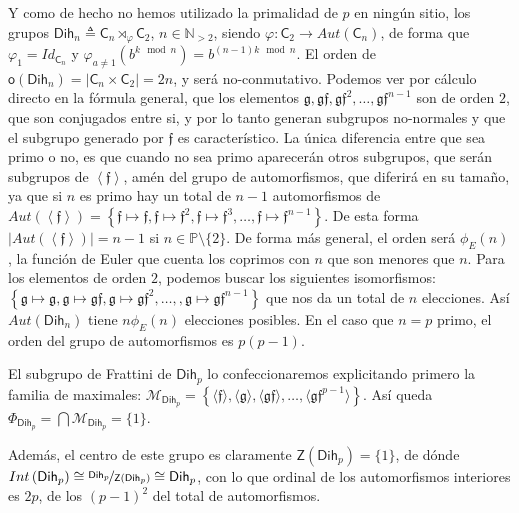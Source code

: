 \documentclass[12pt,a4paper,fleqn,spanish,final,openright]{extbook}
\theoremstyle{definition}
\theoremstyle{remark}
\begin{document}
Y como de hecho no hemos utilizado la primalidad de $p$ en ningún sitio, los grupos $\mathsf{Dih}_{n} \triangleq \mathsf{C}_{n}\rtimes_{\varphi }\mathsf{C}_{2}$, $n    \in \mathds{N}_{{}>2}$, siendo $\varphi : \mathsf{C}_{2}     \longrightarrow     Aut(\mathsf{C}_{n})$, de forma que $\varphi_1 = Id_{\mathsf{C}_{n}}$ y $\varphi_{a    \neq     1}(b^{k \mod n}) = b^{(n-1)k \mod n}$. El orden de $\mathsf{o}(\mathsf{Dih}_{n})=\left|\mathsf{C}_{n}    \times     \mathsf{C}_{2}\right|=2n$, y será no-conmutativo.
Podemos ver por cálculo directo en la fórmula general, que los elementos $\mathfrak{g},\mathfrak{gf},\mathfrak{gf}^2, \ldots , \mathfrak{gf}^{n-1}$ son de orden $2$, que son conjugados entre si, y por lo tanto generan subgrupos no-normales y que el subgrupo generado por $\mathfrak{f}$ es característico. La única diferencia entre que sea primo o no, es que cuando no sea primo aparecerán otros subgrupos, que serán subgrupos de $\left\langle\mathfrak{f}\right\rangle$, amén del grupo de automorfismos, que diferirá en su tamaño, ya que si $n$ es primo hay un total de $n-1$ automorfismos de $Aut(\left\langle\mathfrak{f}\right\rangle) = \left\lbrace{\mathfrak{f}   \mapsto \mathfrak{f},\mathfrak{f}   \mapsto \mathfrak{f}^2,\mathfrak{f}   \mapsto \mathfrak{f}^3,\ldots ,\mathfrak{f}   \mapsto \mathfrak{f}^{n-1} }\right\rbrace$. De esta forma $\left|Aut(\left\langle\mathfrak{f}\right\rangle)\right|=n-1$ si $n   \in \mathds{P}\setminus\{2\}$. De forma más general, el orden será $\phi_{E}(n)$, la función de Euler que cuenta los coprimos con $n$ que son menores que $n$.
Para los elementos de orden $2$, podemos buscar los siguientes isomorfismos: $\left\{{\mathfrak{g}   \mapsto \mathfrak{g},\mathfrak{g}   \mapsto \mathfrak{g}\mathfrak{f},\mathfrak{g}   \mapsto \mathfrak{g}\mathfrak{f}^2,\ldots,,\mathfrak{g}   \mapsto \mathfrak{g}\mathfrak{f}^{n-1}}\right\}$ que nos da un total de $n$ elecciones. Así $Aut(\mathsf{Dih}_{n})$ tiene $n\phi_{E}(n)$ elecciones posibles. En el caso que $n=p$ primo, el orden del grupo de automorfismos es $p(p-1)$.

El subgrupo de Frattini de ${\mathsf{Dih}}_{p}$ lo confeccionaremos explicitando primero la familia de maximales:
${\mathcal{M}}_{{\mathsf{Dih}}_{p}} = \left\{ { \langle \mathfrak{f} \rangle,\langle \mathfrak{g} \rangle,\langle
\mathfrak{gf}\rangle,\ldots,\langle \mathfrak{gf}^{p-1}\rangle } \right\} $. Así queda $\Phi_{{\mathsf{Dih}}_{p}} =
\bigcap\mathcal{M}_{{\mathsf{Dih}}_{p}} = \{1\}$.

Además, el centro de este grupo es claramente $\mathsf{Z}\left({{\mathsf{Dih}}_{p}}\right)=\{1\}$, de dónde $Int\left({{\mathsf{Dih}}_{p}}\right)   \cong   \nicefrac{{{\mathsf{Dih}}_{p}}}{\mathsf{Z}({{\mathsf{Dih}}_{p}})}   \cong   {{\mathsf{Dih}}_{p}}$, con lo que ordinal de los automorfismos interiores es $2p$, de los $(p-1)^2$ del total de automorfismos.
\end{document}
